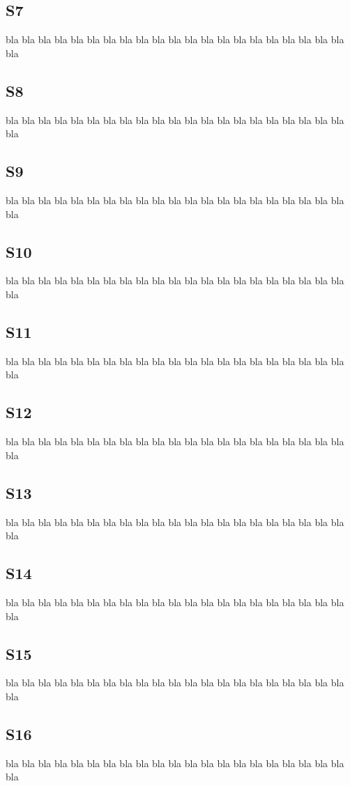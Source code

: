 \documentclass[12pt,a4paper]{article}
\begin{document}
\subsection{S7}
bla bla bla bla bla bla bla bla bla bla bla
bla bla bla bla bla bla bla bla bla bla bla
\subsection{S8}
bla bla bla bla bla bla bla bla bla bla bla
bla bla bla bla bla bla bla bla bla bla bla
\subsection{S9}
bla bla bla bla bla bla bla bla bla bla bla
bla bla bla bla bla bla bla bla bla bla bla
\subsection{S10}
bla bla bla bla bla bla bla bla bla bla bla
bla bla bla bla bla bla bla bla bla bla bla
\subsection{S11}
bla bla bla bla bla bla bla bla bla bla bla
bla bla bla bla bla bla bla bla bla bla bla
\subsection{S12}
bla bla bla bla bla bla bla bla bla bla bla
bla bla bla bla bla bla bla bla bla bla bla
\subsection{S13}
bla bla bla bla bla bla bla bla bla bla bla
bla bla bla bla bla bla bla bla bla bla bla
\subsection{S14}
bla bla bla bla bla bla bla bla bla bla bla
bla bla bla bla bla bla bla bla bla bla bla
\subsection{S15}
bla bla bla bla bla bla bla bla bla bla bla
bla bla bla bla bla bla bla bla bla bla bla
\subsection{S16}
bla bla bla bla bla bla bla bla bla bla bla
bla bla bla bla bla bla bla bla bla bla bla
\end{document}
